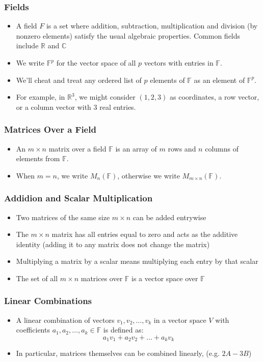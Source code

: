 \documentclass[a4paper, 9pt]{extarticle}
\begin{document}
\subsubsection{Fields}
\begin{itemize}
  \item A field $F$ is a set where addition, subtraction, multiplication and division (by nonzero elements)  satisfy the usual algebraic properties. Common fields include $\mathbb{R}$ and $\mathbb{C}$
  \item We write $\mathbb{F}^p$ for the vector space of all $p$ vectors with entries in $\mathbb{F}$.
  \item We'll cheat and treat any ordered list of $p$ elements of $\mathbb{F}$ as an element of $\mathbb{F}^p$.
  \item For example, in $\mathbb{R}^3$, we might consider $(1,2,3)$ as coordinates, a row vector, or a column vector with 3 real entries.
\end{itemize}


\subsubsection{Matrices Over a Field}
\begin{itemize}
  \item An $m \times n$ matrix over a field $\mathbb{F}$ is an array of $m$ rows and $n$ columns of elements from $\mathbb{F}$.
  \item When $m = n$, we write $M_n(\mathbb{F})$, otherwise we write $M_{m \times n}(\mathbb{F})$.
\end{itemize}
\subsubsection{Addidion and Scalar Multiplication}
\begin{itemize}
  \item Two matrices of the same size $m \times n$ can be added entrywise
  \item The $m \times n$ matrix has all entries equal to zero and acts as the additive identity (adding it to any matrix does not change the matrix)
  \item Multiplying a matrix by a scalar means multiplying each entry by that scalar
  \item The set of all $m \times n$ matrices over $\mathbb{F}$ is a vector space over $\mathbb{F}$
\end{itemize}
\subsubsection{Linear Combinations}
\begin{itemize}
  \item A linear combination of vectors $v_1, v_2, \ldots, v_k$ in a vector space $V$ with coefficients $a_1, a_2, \ldots, a_k \in \mathbb{F}$ is defined as:
        $$ a_1v_1 + a_2v_2 + \ldots + a_kv_k$$
  \item In particular, matrices themselves can be combined linearly, (e.g. $2A - 3B$)
\end{itemize}
\end{document}
